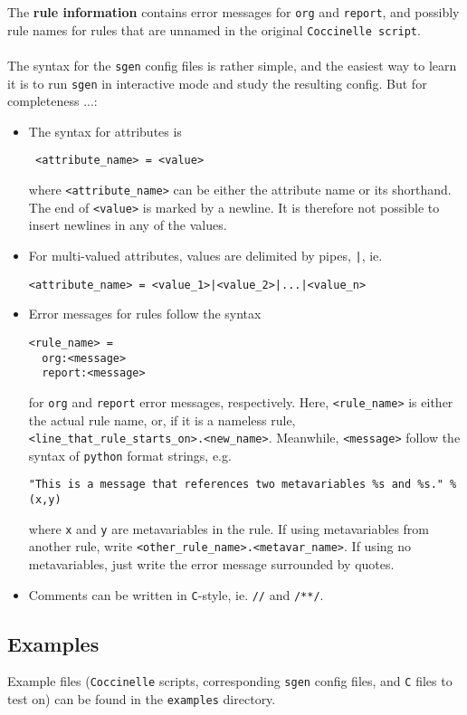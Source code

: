 The \textbf{rule information} contains error messages for \texttt{org} and \texttt{report}, and possibly rule names for rules that are unnamed in the original \texttt{Coccinelle script}.\\\\
\clearpage
\noindent The syntax for the \texttt{sgen} config files is rather simple, and the easiest way to learn it is to run \texttt{sgen} in interactive mode and study the resulting config. But for completeness ...:
\begin{itemize}
\item The syntax for attributes is
\begin{verbatim}
 <attribute_name> = <value>
\end{verbatim}
where \texttt{<attribute\_name>} can be either the attribute name or its shorthand. The end of \texttt{<value>} is marked by a newline. It is therefore not possible to insert newlines in any of the values.
\item For multi-valued attributes, values are delimited by pipes, \texttt{|}, ie.
\begin{verbatim}
<attribute_name> = <value_1>|<value_2>|...|<value_n>
\end{verbatim}
\item Error messages for rules follow the syntax
\begin{verbatim}
<rule_name> =
  org:<message>
  report:<message>
\end{verbatim}
for \texttt{org} and \texttt{report} error messages, respectively. Here, \texttt{<rule\_name>} is either the actual rule name, or, if it is a nameless rule, \texttt{<line\_that\_rule\_starts\_on>.<new\_name>}.\newline
Meanwhile, \texttt{<message>} follow the syntax of \texttt{python} format strings, e.g.
\begin{verbatim}
"This is a message that references two metavariables %s and %s." % (x,y)
\end{verbatim}
where \texttt{x} and \texttt{y} are metavariables in the rule. If using metavariables from another rule, write \texttt{<other\_rule\_name>.<metavar\_name>}. If using no metavariables, just write the error message surrounded by quotes.
\item Comments can be written in \texttt{C}-style, ie. \texttt{//} and \texttt{/**/}.
\end{itemize}
\bigskip

\subsection{Examples}
Example files (\texttt{Coccinelle} scripts, corresponding \texttt{sgen} config files, and \texttt{C} files to test on) can be found in the \texttt{examples} directory.

